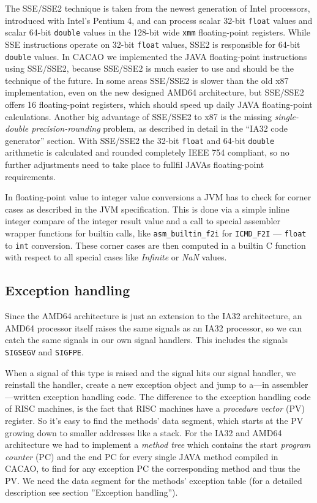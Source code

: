 The SSE/SSE2 technique is taken from the newest generation of Intel
processors, introduced with Intel's Pentium 4, and can process scalar
32-bit \texttt{float} values and scalar 64-bit \texttt{double} values
in the 128-bit wide \texttt{xmm} floating-point registers. While SSE
instructions operate on 32-bit \texttt{float} values, SSE2 is
responsible for 64-bit \texttt{double} values. In CACAO we implemented
the JAVA floating-point instructions using SSE/SSE2, because SSE/SSE2
is much easier to use and should be the technique of the future. In
some areas SSE/SSE2 is slower than the old x87 implementation, even on
the new designed AMD64 architecture, but SSE/SSE2 offers 16
floating-point registers, which should speed up daily JAVA
floating-point calculations. Another big advantage of SSE/SSE2 to x87
is the missing \textit{single-double precision-rounding} problem, as
described in detail in the ``IA32 code generator'' section. With
SSE/SSE2 the 32-bit \texttt{float} and 64-bit \texttt{double}
arithmetic is calculated and rounded completely IEEE 754 compliant, so
no further adjustments need to take place to fullfil JAVAs
floating-point requirements.

In floating-point value to integer value conversions a JVM has to
check for corner cases as described in the JVM specification. This is
done via a simple inline integer compare of the integer result value
and a call to special assembler wrapper functions for builtin calls,
like \texttt{asm\_builtin\_f2i} for \texttt{ICMD\_F2I} ---
\texttt{float} to \texttt{int} conversion. These corner cases are then
computed in a builtin C function with respect to all special cases
like \textit{Infinite} or \textit{NaN} values.


\subsection{Exception handling}

Since the AMD64 architecture is just an extension to the IA32
architecture, an AMD64 processor itself raises the same signals as an
IA32 processor, so we can catch the same signals in our own signal
handlers. This includes the signals \texttt{SIGSEGV} and
\texttt{SIGFPE}.

When a signal of this type is raised and the signal hits our signal
handler, we reinstall the handler, create a new exception object and
jump to a---in assembler---written exception handling code. The
difference to the exception handling code of RISC machines, is the
fact that RISC machines have a \textit{procedure vector} (PV)
register. So it's easy to find the methods' data segment, which starts
at the PV growing down to smaller addresses like a stack. For the IA32
and AMD64 architecture we had to implement a \textit{method tree}
which contains the start \textit{program counter} (PC) and the end PC
for every single JAVA method compiled in CACAO, to find for any
exception PC the corresponding method and thus the PV. We need the
data segment for the methods' exception table (for a detailed
description see section ''Exception handling'').

